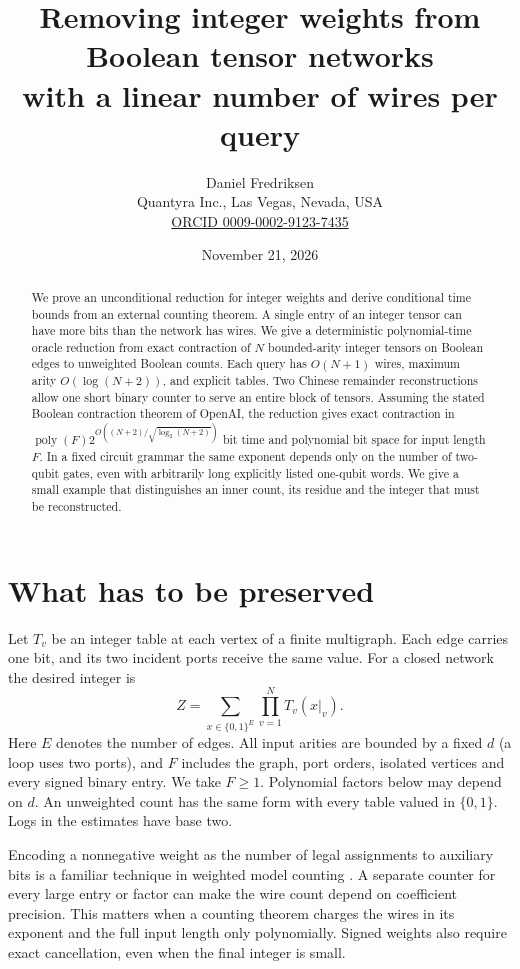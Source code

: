 \documentclass[11pt]{article}
\title{Removing integer weights from Boolean tensor networks\\with a linear number of wires per query}
\author{Daniel Fredriksen\\{\small Quantyra Inc., Las Vegas, Nevada, USA}\\
{\small\href{https://orcid.org/0009-0002-9123-7435}{ORCID 0009-0002-9123-7435}}}
\date{November 21, 2026}
\newcommand{\bits}{\{0,1\}}
\newcommand{\poly}{\operatorname{poly}}
\begin{document}
\maketitle
\begin{abstract}
We prove an unconditional reduction for integer weights and derive conditional time bounds from an external counting theorem. A single entry of an integer tensor can have more bits than the network has wires. We give a deterministic polynomial-time oracle reduction from exact contraction of $N$ bounded-arity integer tensors on Boolean edges to unweighted Boolean counts. Each query has $O(N+1)$ wires, maximum arity $O(\log(N+2))$, and explicit tables. Two Chinese remainder reconstructions allow one short binary counter to serve an entire block of tensors. Assuming the stated Boolean contraction theorem of OpenAI, the reduction gives exact contraction in $\poly(F)2^{O((N+2)/\sqrt{\log_2(N+2)})}$ bit time and polynomial bit space for input length $F$. In a fixed circuit grammar the same exponent depends only on the number of two-qubit gates, even with arbitrarily long explicitly listed one-qubit words. We give a small example that distinguishes an inner count, its residue and the integer that must be reconstructed.
\end{abstract}

\section{What has to be preserved}
Let $T_v$ be an integer table at each vertex of a finite multigraph. Each edge carries one bit, and its two incident ports receive the same value. For a closed network the desired integer is
\begin{equation}
 Z=\sum_{x\in\bits^E}\prod_{v=1}^{N}T_v(x|_v).
 \label{eq:contraction}
\end{equation}
Here $E$ denotes the number of edges. All input arities are bounded by a fixed $d$ (a loop uses two ports), and $F$ includes the graph, port orders, isolated vertices and every signed binary entry. We take $F\ge 1$. Polynomial factors below may depend on $d$. An unweighted count has the same form with every table valued in $\{0,1\}$. Logs in the estimates have base two.

Encoding a nonnegative weight as the number of legal assignments to auxiliary bits is a familiar technique in weighted model counting \cite{cfmv}. A separate counter for every large entry or factor can make the wire count depend on coefficient precision. This matters when a counting theorem charges the wires in its exponent and the full input length only polynomially. Signed weights also require exact cancellation, even when the final integer is small.
\end{document}

